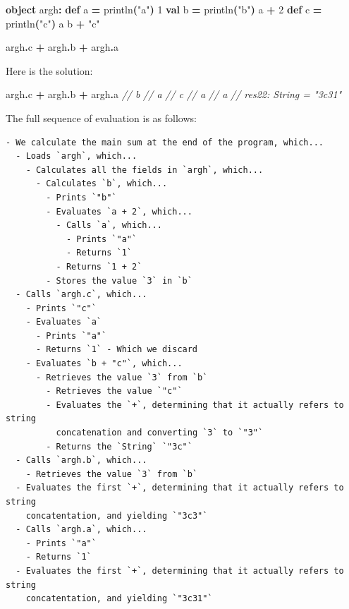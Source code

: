 \documentclass[11pt,a5paper,]{book}
\newenvironment{Shaded}{\begin{snugshade}}{\end{snugshade}}
\newcommand{\CommentTok}[1]{\textcolor[rgb]{0.56,0.35,0.01}{\textit{#1}}}
\newcommand{\DecValTok}[1]{\textcolor[rgb]{0.00,0.00,0.81}{#1}}
\newcommand{\FunctionTok}[1]{\textcolor[rgb]{0.00,0.00,0.00}{#1}}
\newcommand{\KeywordTok}[1]{\textcolor[rgb]{0.13,0.29,0.53}{\textbf{#1}}}
\newcommand{\NormalTok}[1]{#1}
\newcommand{\OperatorTok}[1]{\textcolor[rgb]{0.81,0.36,0.00}{\textbf{#1}}}
\newcommand{\StringTok}[1]{\textcolor[rgb]{0.31,0.60,0.02}{#1}}
\begin{document}
\begin{Shaded}
\begin{Highlighting}[]
\KeywordTok{object}\NormalTok{ argh}\OperatorTok{:}
  \KeywordTok{def}\NormalTok{ a }\OperatorTok{=} 
    \FunctionTok{println}\OperatorTok{(}\StringTok{"a"}\OperatorTok{)}
    \DecValTok{1}
  \KeywordTok{val}\NormalTok{ b }\OperatorTok{=} 
    \FunctionTok{println}\OperatorTok{(}\StringTok{"b"}\OperatorTok{)}
\NormalTok{    a }\OperatorTok{+} \DecValTok{2}
  \KeywordTok{def}\NormalTok{ c }\OperatorTok{=} 
    \FunctionTok{println}\OperatorTok{(}\StringTok{"c"}\OperatorTok{)}
\NormalTok{    a}
\NormalTok{    b }\OperatorTok{+} \StringTok{"c"}
\end{Highlighting}
\end{Shaded}

\begin{Shaded}
\begin{Highlighting}[]
\NormalTok{argh}\OperatorTok{.}\NormalTok{c }\OperatorTok{+}\NormalTok{ argh}\OperatorTok{.}\NormalTok{b }\OperatorTok{+}\NormalTok{ argh}\OperatorTok{.}\NormalTok{a}
\end{Highlighting}
\end{Shaded}

Here is the solution:

\begin{Shaded}
\begin{Highlighting}[]
\NormalTok{argh}\OperatorTok{.}\NormalTok{c }\OperatorTok{+}\NormalTok{ argh}\OperatorTok{.}\NormalTok{b }\OperatorTok{+}\NormalTok{ argh}\OperatorTok{.}\NormalTok{a}
\CommentTok{// b}
\CommentTok{// a}
\CommentTok{// c}
\CommentTok{// a}
\CommentTok{// a}
\CommentTok{// res22: String = "3c31"}
\end{Highlighting}
\end{Shaded}

The full sequence of evaluation is as follows:

\begin{verbatim}
- We calculate the main sum at the end of the program, which...
  - Loads `argh`, which...
    - Calculates all the fields in `argh`, which...
      - Calculates `b`, which...
        - Prints `"b"`
        - Evaluates `a + 2`, which...
          - Calls `a`, which...
            - Prints `"a"`
            - Returns `1`
          - Returns `1 + 2`
        - Stores the value `3` in `b`
  - Calls `argh.c`, which...
    - Prints `"c"`
    - Evaluates `a`
      - Prints `"a"`
      - Returns `1` - Which we discard
    - Evaluates `b + "c"`, which...
      - Retrieves the value `3` from `b`
        - Retrieves the value `"c"`
        - Evaluates the `+`, determining that it actually refers to string
          concatenation and converting `3` to `"3"`
        - Returns the `String` `"3c"`
  - Calls `argh.b`, which...
    - Retrieves the value `3` from `b`
  - Evaluates the first `+`, determining that it actually refers to string
    concatentation, and yielding `"3c3"`
  - Calls `argh.a`, which...
    - Prints `"a"`
    - Returns `1`
  - Evaluates the first `+`, determining that it actually refers to string
    concatentation, and yielding `"3c31"`
\end{verbatim}
\end{document}
